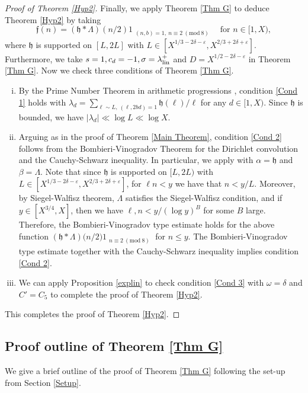 \documentclass[12pt]{amsart}
\numberwithin{equation}{section}
\theoremstyle{remark}
\theoremstyle{definition}
\newcommand{\imod}[1]{\ (\mathrm{mod}\ #1)}
\begin{document}
\begin{proof}[Proof of Theorem \ref{Hyp2}] Finally, we apply Theorem \ref{Thm G} to deduce Theorem \ref{Hyp2} by taking\[\mathfrak{f}(n)=(\mathfrak{h}*\Lambda)(n/2)1_{\substack{(n, b)=1,\: n\equiv 2\imod 8}} \quad \text{for $n\in [1, X)$},\] 
where $\mathfrak{h}$ is supported on $[L, 2L]$ with $L\in [X^{1/3-2\delta-\varepsilon}, X^{2/3+2\delta+\varepsilon}]$. Furthermore, we take $s=1, c_d=-1, {\sigma}=\lambda_{\textup{lin}}^+$ and $D=X^{1/2-2\delta-\varepsilon}$ in Theorem \ref{Thm G}. Now we check three conditions of Theorem \ref{Thm G}.
\begin{enumerate}[(i)]
\item By the Prime Number Theorem in arithmetic progressions \cite[Chapters 20, 22]{dav}, condition \ref{Cond 1} holds with $\lambda_d=\sum_{\ell\sim L,\: (\ell, 2bd)=1}\mathfrak{h}(\ell)/\ell$ for any $d\in [1, X)$. Since $\mathfrak{h}$ is bounded, we have $|\lambda_d|\ll \log L\ll\log X$.
 \item Arguing as in the proof of Theorem \ref{Main Theorem}, condition \ref{Cond 2} follows from the Bombieri-Vinogradov Theorem for the Dirichlet convolution and the Cauchy-Schwarz inequality. In particular, we apply \cite[Theorem 9.17]{opera}  with $\alpha = \mathfrak{h}$ and $\beta=\Lambda$. Note that since $\mathfrak{h}$ is supported on $[L, 2L)$ with $L\in [X^{1/3-2\delta-\varepsilon}, X^{2/3+2\delta+\varepsilon}]$, for $\ell n<y$ we have that $n<y/L$. Moreover, by Siegel-Walfisz theorem, $\Lambda$ satisfies the Siegel-Walfisz condition, and if $y\in [X^{3/4}, X]$, then we have $\ell, n <y/(\log y)^B$ for some $B$ large. Therefore, the Bombieri-Vinogradov type estimate holds for the above function $(\mathfrak{h}*\Lambda)\big(n/2\big)1_{\substack{n\equiv 2\imod 8}}$ for $n\leq y$. The Bombieri-Vinogradov type estimate together with the Cauchy-Schwarz inequality implies condition \ref{Cond 2}.
\item We can apply Proposition \ref{explin} to check condition \ref{Cond 3} with $\omega=\delta$ and $C'=C_5$ to complete the proof of Theorem \ref{Hyp2}.
\end{enumerate}
This completes the proof of Theorem \ref{Hyp2}.
\end{proof}



\subsection{Proof outline of Theorem \ref{Thm G}}
We give a brief outline of the proof of Theorem \ref{Thm G} following the set-up from Section \ref{Setup}. 
\end{document}
